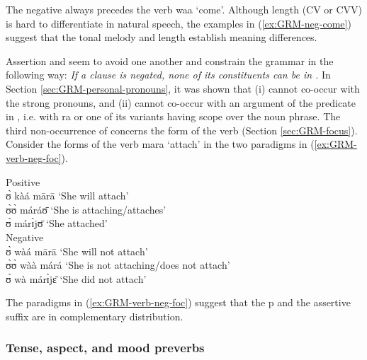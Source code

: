 \begin{exe}
\begin{exe}
\begin{exe}
\begin{exe}
\begin{exe}
\begin{exe}
\begin{exe}
\begin{exe}
\begin{exe}
\begin{exe}
\begin{exe}
\begin{exe}
\z 
 \z
 
 The negative   always precedes the verb {\sls waa} `come'. Although 
length (CV or CVV) is  hard to differentiate in natural speech, the examples in 
(\ref{ex:GRM-neg-come}) suggest that the tonal melody and length  establish 
meaning differences.

Assertion and  seem to avoid one another and constrain the grammar  in the following way:  {\it If a clause is negated,  none of its constituents can be in .} In Section \ref{sec:GRM-personal-pronouns},  it was shown that (i)  cannot co-occur with the strong pronouns, and (ii)  cannot co-occur with an argument of the predicate in , i.e. with {\sls ra} or one of its variants having scope over the noun phrase. The third non-occurrence of  concerns  the  form of the verb (Section \ref{sec:GRM-focus}).  Consider the forms of the verb {\sls mara} `attach' in the two paradigms in (\ref{ex:GRM-verb-neg-foc}).


   \ea\label{ex:GRM-verb-neg-foc}

   \ea\label{ex:GRM-verb-neg-foc-pos}{\rm Positive}\\

 ʊ̀ kàá mārā   {\rm  `She will attach'}\\
   ʊ̀ʊ̀ máráʊ̄  {\rm  `She  is attaching/attaches'}\\
  ʊ̀ márɪ̀jʊ̄ {\rm `She   attached'}\\

  \ex\label{ex:GRM-verb-neg-foc-neg}{\rm Negative}\\

 ʊ̀ wàá mārā  {\rm `She will not attach'}\\
   ʊ̀ʊ̀ wàà márá {\rm  `She  is  not attaching/does not attach'}\\
  ʊ̀ wà márɪ̀jɛ̄   {\rm  `She   did not attach'}\\


\z 
 \z

The paradigms in (\ref{ex:GRM-verb-neg-foc})  suggest that the  
p 
and the assertive suffix are in complementary distribution. 

\subsubsection{Tense, aspect, and mood preverbs}
\label{sec:GRM-tam-preverbs}



\end{exe}
\end{exe}
\end{exe}
\end{exe}
\end{exe}
\end{exe}
\end{exe}
\end{exe}
\end{exe}
\end{exe}
\end{exe}
\end{exe}
